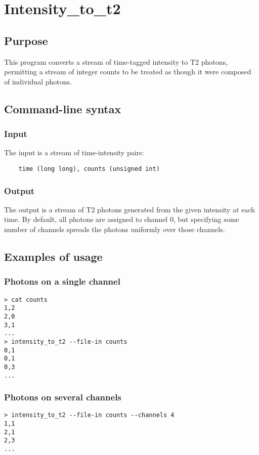 \section{Intensity\_to\_t2}
\subsection{Purpose}
This program converts a stream of time-tagged intensity to T2 photons, permitting a stream of integer counts to be treated as though it were composed of individual photons.

\subsection{Command-line syntax}
%

\subsubsection{Input}
The input is a stream of time-intensity pairs:
\begin{verbatim}
    time (long long), counts (unsigned int)
\end{verbatim}

\subsubsection{Output}
The output is a stream of T2 photons generated from the given intensity at each time. By default, all photons are assigned to channel 0, but specifying some number of channels spreads the photons uniformly over those channels.

\subsection{Examples of usage}
\subsubsection{Photons on a single channel}
\begin{verbatim}
> cat counts
1,2
2,0
3,1
...
> intensity_to_t2 --file-in counts
0,1
0,1
0,3
...
\end{verbatim}

\subsubsection{Photons on several channels}
\begin{verbatim}
> intensity_to_t2 --file-in counts --channels 4
1,1
2,1
2,3
...
\end{verbatim}